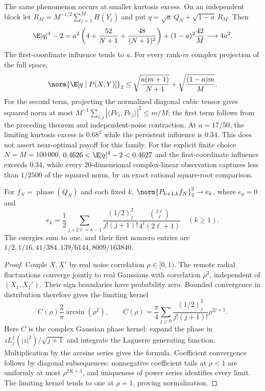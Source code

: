 The same phenomenon occurs at smaller kurtosis excess. On an independent
block let $R_M=M^{-1/2}\sum_{j=1}^M H(Y_j)$ and put
$q=\sqrt a\,Q_N+\sqrt{1-a}\,R_M$. Then
\[
 \E|q|^4-2
 =a^2\left(4+\frac{52}{N+1}+\frac{48}{(N+1)^2}\right)
 +(1-a)^2\frac{42}{M}\longrightarrow4a^2.
\]
The first-coordinate influence tends to $a$. For every rank-$m$
complex projection of the full space,
\[
 \norm{\E[q\mid P(X,Y)]}_2
 \le\sqrt{\frac{a(m+1)}{N+1}}+\sqrt{\frac{(1-a)m}{M}}.
\]
For the second term, projecting the normalized diagonal cubic tensor
gives squared norm at most
$M^{-1}\sum_{i,j}|\langle Pe_i,Pe_j\rangle|^2\le m/M$;
the first term follows from the preceding theorem and independent-noise
contraction. At $a=17/50$, the limiting kurtosis excess is $0.68^2$
while the persistent influence is $0.34$. This does not assert
near-optimal payoff for this family.
For the explicit finite choice $N=M=100\,000$,
$0.4626<\E|q|^4-2<0.4627$ and the first-coordinate influence exceeds
$0.34$, while every 20-dimensional complex-linear observation captures
less than $1/2500$ of the squared norm, by an exact rational
square-root comparison.

\begin{theorem}
\label{thm:joint-radial-spectrum}
For $f_N=\operatorname{phase}(Q_N)$ and each fixed $k$,
$\norm{P_{k+1,k}f_N}_2^2\to e_k$, where $e_0=0$ and
\[
 e_k=\frac12\sum_{j+2\ell=k-1}
 \frac{(1/2)_j^2}{j!(j+1)!}
 \frac{\binom{2\ell}{\ell}}{4^\ell(2\ell+1)}\quad(k\ge1).
\]
The energies sum to one, and their first nonzero entries are
$1/2,1/16,41/384,139/6144,8009/163840$.
\end{theorem}
\begin{proof}
Couple $X,X'$ by real noise correlation $\rho\in[0,1)$.
The remote radial fluctuations converge jointly to real Gaussians with
correlation $\rho^2$, independent of $(X_1,X_1')$.
Their sign boundaries have probability zero. Bounded convergence in
distribution therefore gives the limiting kernel
\[
 C(\rho)\frac2\pi\arcsin(\rho^2),\qquad
 C(\rho)=\frac\pi4\sum_{j\ge0}
 \frac{(1/2)_j^2}{j!(j+1)!}\rho^{2j+1}.
\]
Here $C$ is the complex Gaussian phase kernel: expand the phase in
$zL_j^1(|z|^2)/\sqrt{j+1}$ and integrate the Laguerre generating
function. Multiplication by the arcsine series gives the formula.
Coefficient convergence follows by diagonal subsequences: nonnegative
coefficient tails at $\rho<1$ are uniformly at most
$\rho^{2K+3}$, and uniqueness of power series identifies every limit.
The limiting kernel tends to one at $\rho=1$, proving normalization.
\end{proof}

